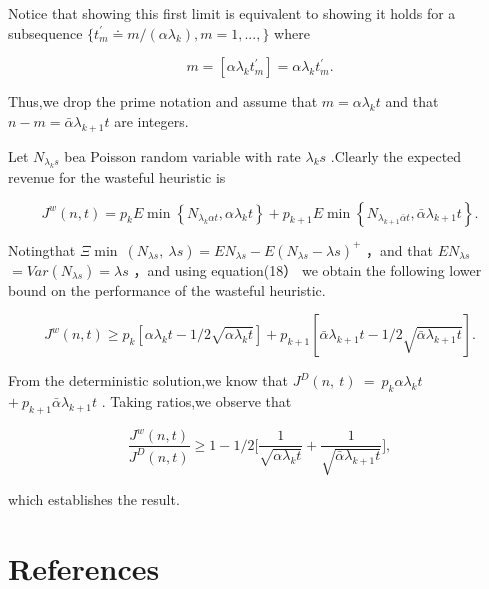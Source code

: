 Notice that showing this first limit is equivalent to showing it holds
for a subsequence
\(\{ t _ { m } ^ { \prime } \doteq m / ( \alpha \lambda _ { k } ) , m = 1 , . . . , \}\)
where

\[
m = [ \alpha \lambda _ { k } t _ { m } ^ { \prime } ] = \alpha \lambda _ { k } t _ { m } ^ { \prime } .
\]

Thus,we drop the prime notation and assume that
\(m = \alpha \lambda _ { k } t\) and that
\(n - m = \bar { \alpha } \lambda _ { k + 1 } t\) are integers.

Let \(N _ { \lambda _ { k } s }\) bea Poisson random variable with rate
\(\lambda _ { k } s\) .Clearly the expected revenue for the wasteful
heuristic is

\[
J ^ { w } ( n , t ) = p _ { k } E \operatorname* { m i n } \left\{ N _ { \lambda _ { k } \alpha t } , \alpha \lambda _ { k } t \right\} + p _ { k + 1 } E \operatorname* { m i n } \left\{ N _ { \lambda _ { k + 1 } \bar { \alpha } t } , \bar { \alpha } \lambda _ { k + 1 } t \right\} .
\]

Notingthat
\(\Xi \operatorname * { m i n } \ ( N _ { \lambda s } , \ \lambda s ) = E N _ { \lambda s } - E ( N _ { \lambda s } - \lambda s ) ^ { + }\)
，and that \(E N _ { \lambda s }\)
\(= V a r ( N _ { \lambda s } ) = \lambda s\) ，and using equation(18）
we obtain the following lower bound on the performance of the wasteful
heuristic.

\[
J ^ { w } ( n , t ) \geq p _ { k } [ \alpha \lambda _ { k } t - 1 / 2 \sqrt { \alpha \lambda _ { k } t } ] + p _ { k + 1 } [ \bar { \alpha } \lambda _ { k + 1 } t - 1 / 2 \sqrt { \bar { \alpha } \lambda _ { k + 1 } t } ] .
\]

From the deterministic solution,we know that
\(J ^ { D } ( n , \ t ) \ = \ p _ { k } \alpha \lambda _ { k } t\)
\(+ \ p _ { k + 1 } \bar { \alpha } \lambda _ { k + 1 } t\) . Taking
ratios,we observe that

\[
\frac { J ^ { w } ( n , t ) } { J ^ { D } ( n , t ) } \geq 1 - 1 / 2 \biggl [ \frac { 1 } { \sqrt { \alpha \lambda _ { k } t } } + \frac { 1 } { \sqrt { \bar { \alpha } \lambda _ { k + 1 } t } } \biggr ] ,
\]

which establishes the result.

\section{References}\label{references}

